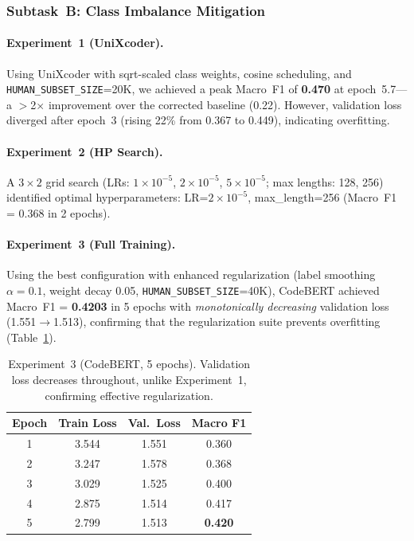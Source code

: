 \documentclass[11pt]{article}
\begin{document}
\subsubsection{Subtask~B: Class Imbalance Mitigation}

\paragraph{Experiment~1 (UniXcoder).} Using UniXcoder with sqrt-scaled class weights, cosine scheduling, and \texttt{HUMAN\_SUBSET\_SIZE}=20K, we achieved a peak Macro~F1 of \textbf{0.470} at epoch~5.7---a $>$2$\times$ improvement over the corrected baseline (0.22). However, validation loss diverged after epoch~3 (rising 22\% from 0.367 to 0.449), indicating overfitting.

\paragraph{Experiment~2 (HP Search).} A $3{\times}2$ grid search (LRs: $1{\times}10^{-5}$, $2{\times}10^{-5}$, $5{\times}10^{-5}$; max lengths: 128, 256) identified optimal hyperparameters: LR=$2{\times}10^{-5}$, max\_length=256 (Macro~F1 = 0.368 in 2 epochs).

\paragraph{Experiment~3 (Full Training).} Using the best configuration with enhanced regularization (label smoothing $\alpha{=}0.1$, weight decay 0.05, \texttt{HUMAN\_SUBSET\_SIZE}=40K), CodeBERT achieved Macro~F1 = \textbf{0.4203} in 5 epochs with \emph{monotonically decreasing} validation loss (1.551$\to$1.513), confirming that the regularization suite prevents overfitting (Table~\ref{tab:taskB_exp3_progress}).

\begin{table}[ht]
\centering
\footnotesize
\begin{tabularx}{\columnwidth}{@{}c c c c@{}}
\toprule
\textbf{Epoch} & \textbf{Train Loss} & \textbf{Val.\ Loss} & \textbf{Macro F1} \\ \midrule
1 & 3.544 & 1.551 & 0.360 \\
2 & 3.247 & 1.578 & 0.368 \\
3 & 3.029 & 1.525 & 0.400 \\
4 & 2.875 & 1.514 & 0.417 \\
5 & 2.799 & 1.513 & \textbf{0.420} \\
\bottomrule
\end{tabularx}
\caption{Experiment~3 (CodeBERT, 5 epochs). Validation loss decreases throughout, unlike Experiment~1, confirming effective regularization.}
\label{tab:taskB_exp3_progress}
\end{table}
\end{document}
